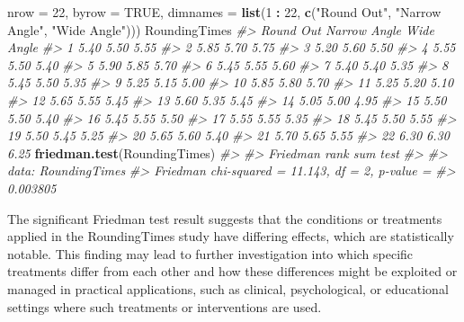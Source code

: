 \documentclass[
]{book}
\newenvironment{Shaded}{\begin{snugshade}}{\end{snugshade}}
\newcommand{\AttributeTok}[1]{\textcolor[rgb]{0.13,0.29,0.53}{#1}}
\newcommand{\CommentTok}[1]{\textcolor[rgb]{0.56,0.35,0.01}{\textit{#1}}}
\newcommand{\ConstantTok}[1]{\textcolor[rgb]{0.56,0.35,0.01}{#1}}
\newcommand{\DecValTok}[1]{\textcolor[rgb]{0.00,0.00,0.81}{#1}}
\newcommand{\FunctionTok}[1]{\textcolor[rgb]{0.13,0.29,0.53}{\textbf{#1}}}
\newcommand{\NormalTok}[1]{#1}
\newcommand{\SpecialCharTok}[1]{\textcolor[rgb]{0.81,0.36,0.00}{\textbf{#1}}}
\newcommand{\StringTok}[1]{\textcolor[rgb]{0.31,0.60,0.02}{#1}}
\begin{document}
\begin{Shaded}
\begin{Highlighting}[]
       \AttributeTok{nrow =} \DecValTok{22}\NormalTok{,}
       \AttributeTok{byrow =} \ConstantTok{TRUE}\NormalTok{,}
       \AttributeTok{dimnames =} \FunctionTok{list}\NormalTok{(}\DecValTok{1} \SpecialCharTok{:} \DecValTok{22}\NormalTok{,}
                       \FunctionTok{c}\NormalTok{(}\StringTok{"Round Out"}\NormalTok{, }\StringTok{"Narrow Angle"}\NormalTok{, }\StringTok{"Wide Angle"}\NormalTok{)))}
\NormalTok{RoundingTimes}
\CommentTok{\#\textgreater{}    Round Out Narrow Angle Wide Angle}
\CommentTok{\#\textgreater{} 1       5.40         5.50       5.55}
\CommentTok{\#\textgreater{} 2       5.85         5.70       5.75}
\CommentTok{\#\textgreater{} 3       5.20         5.60       5.50}
\CommentTok{\#\textgreater{} 4       5.55         5.50       5.40}
\CommentTok{\#\textgreater{} 5       5.90         5.85       5.70}
\CommentTok{\#\textgreater{} 6       5.45         5.55       5.60}
\CommentTok{\#\textgreater{} 7       5.40         5.40       5.35}
\CommentTok{\#\textgreater{} 8       5.45         5.50       5.35}
\CommentTok{\#\textgreater{} 9       5.25         5.15       5.00}
\CommentTok{\#\textgreater{} 10      5.85         5.80       5.70}
\CommentTok{\#\textgreater{} 11      5.25         5.20       5.10}
\CommentTok{\#\textgreater{} 12      5.65         5.55       5.45}
\CommentTok{\#\textgreater{} 13      5.60         5.35       5.45}
\CommentTok{\#\textgreater{} 14      5.05         5.00       4.95}
\CommentTok{\#\textgreater{} 15      5.50         5.50       5.40}
\CommentTok{\#\textgreater{} 16      5.45         5.55       5.50}
\CommentTok{\#\textgreater{} 17      5.55         5.55       5.35}
\CommentTok{\#\textgreater{} 18      5.45         5.50       5.55}
\CommentTok{\#\textgreater{} 19      5.50         5.45       5.25}
\CommentTok{\#\textgreater{} 20      5.65         5.60       5.40}
\CommentTok{\#\textgreater{} 21      5.70         5.65       5.55}
\CommentTok{\#\textgreater{} 22      6.30         6.30       6.25}
\FunctionTok{friedman.test}\NormalTok{(RoundingTimes)}
\CommentTok{\#\textgreater{} }
\CommentTok{\#\textgreater{}  Friedman rank sum test}
\CommentTok{\#\textgreater{} }
\CommentTok{\#\textgreater{} data:  RoundingTimes}
\CommentTok{\#\textgreater{} Friedman chi{-}squared = 11.143, df = 2, p{-}value =}
\CommentTok{\#\textgreater{} 0.003805}
\end{Highlighting}
\end{Shaded}

The significant Friedman test result suggests that the conditions or treatments applied in the RoundingTimes study have differing effects, which are statistically notable. This finding may lead to further investigation into which specific treatments differ from each other and how these differences might be exploited or managed in practical applications, such as clinical, psychological, or educational settings where such treatments or interventions are used.
\end{document}
